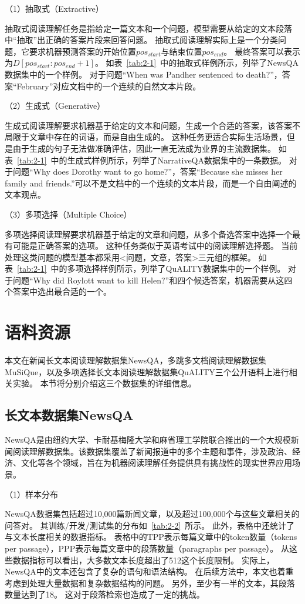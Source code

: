 

（1）抽取式（Extractive）

抽取式阅读理解任务是指给定一篇文本和一个问题，模型需要从给定的文本段落中“抽取”出正确的答案片段来回答问题。
抽取式阅读理解实际上是一个分类问题，它要求机器预测答案的开始位置$pos_{start}$与结束位置$pos_{end}$。
最终答案可以表示为$D[pos_{start}:pos_{end}+1]$。
如表~\ref{tab:2-1}~中的抽取式样例所示，列举了NewsQA数据集中的一个样例。
对于问题“When was Pandher sentenced to death?”，答案“February”对应文档中的一个连续的自然文本片段。

（2）生成式（Generative）

生成式阅读理解要求机器基于给定的文本和问题，生成一个合适的答案，该答案不局限于文章中存在的词语，而是自由生成的。
这种任务更适合实际生活场景，但是由于生成的句子无法做准确评估，因此一直无法成为业界的主流数据集。
如表~\ref{tab:2-1}~中的生成式样例所示，列举了NarrativeQA数据集中的一条数据。
对于问题“Why does Dorothy want to go home?”，答案“Because she misses her family and friends.”可以不是文档中的一个连续的文本片段，而是一个自由阐述的文本观点。

（3）多项选择（Multiple Choice）

多项选择阅读理解要求机器基于给定的文章和问题，从多个备选答案中选择一个最有可能是正确答案的选项。
这种任务类似于英语考试中的阅读理解选择题。
当前处理这类问题的模型基本都采用<问题，文章，答案>三元组的框架。
如表~\ref{tab:2-1}~中的多项选择样例所示，列举了QuALITY数据集中的一个样例。
对于问题“Why did Roylott want to kill Helen?”和四个候选答案，机器需要从这四个答案中选出最合适的一个。


\section{语料资源}
本文在新闻长文本阅读理解数据集NewsQA，多跳多文档阅读理解数据集MuSiQue，以及多项选择长文本阅读理解数据集QuALITY三个公开语料上进行相关实验。
本节将分别介绍这三个数据集的详细信息。

\subsection{长文本数据集NewsQA}
NewsQA是由纽约大学、卡耐基梅隆大学和麻省理工学院联合推出的一个大规模新闻阅读理解数据集。该数据集覆盖了新闻报道中的多个主题和事件，涉及政治、经济、文化等各个领域，旨在为机器阅读理解任务提供具有挑战性的现实世界应用场景。

（1）样本分布

NewsQA数据集包括超过10,000篇新闻文章，以及超过100,000个与这些文章相关的问答对。
其训练/开发/测试集的分布如~\ref{tab:2-2}~所示。
此外，表格中还统计了与文本长度相关的数据指标。
表格中的TPP表示每篇文章中的token数量（tokens per passage），PPP表示每篇文章中的段落数量（paragraphs per passage）。
从这些数据指标可以看出，大多数文本长度超出了512这个长度限制。
实际上，NewsQA中的文本还包含了复杂的语句和语法结构。
在后续方法中，本文也着重考虑到处理大量数据和复杂数据结构的问题。
另外，至少有一半的文本，其段落数量达到了18。
这对于段落检索也造成了一定的挑战。


